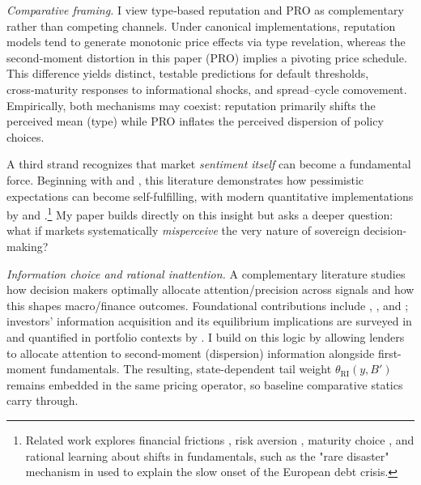 \documentclass[12pt]{article}
\theoremstyle{plain}
\begin{document}
\noindent\textit{Comparative framing.} I view type‑based reputation and PRO as complementary rather than competing channels. Under canonical implementations, reputation models tend to generate monotonic price effects via type revelation, whereas the second‑moment distortion in this paper (PRO) implies a pivoting price schedule. This difference yields distinct, testable predictions for default thresholds, cross‑maturity responses to informational shocks, and spread–cycle comovement. Empirically, both mechanisms may coexist: reputation primarily shifts the perceived mean (type) while PRO inflates the perceived dispersion of policy choices.

A third strand recognizes that market \textit{sentiment itself} can become a
fundamental force. Beginning with \citet{CalvoLeidermanReinhart1996} and
\citet{ColeKehoe2000}, this literature demonstrates how pessimistic
expectations can become self-fulfilling, with modern quantitative
implementations by \citet{GennaioliMartinRossi2014} and
\citet{BocolaDovis2019}.\footnote{Related work explores financial frictions
	\citet{LongstaffPanPedersenSingleton2011}, risk aversion \citet{Lizarazo2013},
	maturity choice \citet{Stangebye2020}, and rational learning about shifts in
	fundamentals, such as the "rare disaster" mechanism in \citet{Paluszynski2023}
	used to explain the slow onset of the European debt crisis.} My paper builds
directly on this insight but asks a deeper question: what if markets
systematically \emph{misperceive} the very nature of sovereign decision-making?

\noindent\textit{Information choice and rational inattention.} A complementary literature studies how decision makers optimally allocate attention/precision across signals and how this shapes macro/finance outcomes. Foundational contributions include \citet{Sims2003}, \citet{MackowiakWiederholt2009}, and \citet{MatejkaMcKay2015}; investors’ information acquisition and its equilibrium implications are surveyed in \citet{Veldkamp2011} and quantified in portfolio contexts by \citet{VanNieuwerburghVeldkamp2009}. I build on this logic by allowing lenders to allocate attention to second-moment (dispersion) information alongside first-moment fundamentals. The resulting, state-dependent tail weight $\theta_{\mathrm{RI}}(y,B')$ remains embedded in the same pricing operator, so baseline comparative statics carry through.
\end{document}
